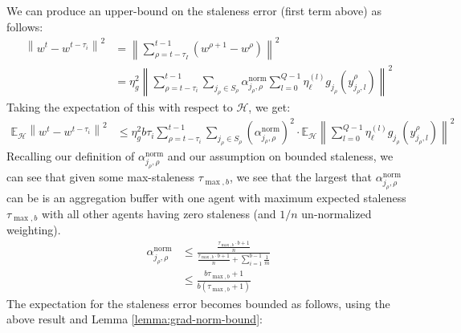 \documentclass{article}
\begin{document}
We can produce an upper-bound on the staleness error (first term above) as follows:
\begin{align*}
    \left\|
        w^t - w^{t - \tau_i}
    \right\|^2
    &= 
    \left\|
        \sum_{\rho = t - \tau_I}^{t-1}
        {
            (w^{\rho + 1} - w^\rho)
        }
    \right\|^2
    \\
    &=
    \eta_g^2 \left\|
        \sum_{\rho = t - \tau_i}^{t-1}
        {
           \sum_{j_\rho \in S_\rho}
           {
                \alpha_{j_\rho, \rho}^\text{norm}
                \sum_{l=0}^{Q-1}
                {
                \eta_\ell^{(l)}
                g_{j_\rho}(y^\rho_{j_\rho, l})
                }
           }
        }
    \right\|^2
\end{align*}
Taking the expectation of this with respect to $\mathcal{H}$, we get:
\begin{align*}
    \mathbb{E}_\mathcal{H}\left\|
        w^t - w^{t - \tau_i}
    \right\|^2
    &\leq 
    \eta_g^2 b \tau_i 
        \sum_{\rho = t - \tau_i}^{t-1}
        {
           \sum_{j_\rho \in S_\rho}
           {
                (\alpha_{j_\rho, \rho}^\text{norm})^2
                \cdot
                \mathbb{E}_\mathcal{H}
                \left\|\sum_{l=0}^{Q-1}
                {
                \eta_\ell^{(l)}
                g_{j_\rho}(y^\rho_{j_\rho, l})
                }
                 \right\|^2
           }
        }
\end{align*}
Recalling our definition of $\alpha^{\text{norm}}_{j_\rho, \rho}$ and our assumption on bounded staleness, we can see that given some max-staleness $\tau_{\max, b}$, we see that the largest that $\alpha^{\text{norm}}_{j_\rho, \rho}$ can be is an aggregation buffer with one agent with maximum expected staleness $\tau_{\max, b}$ with all other agents having zero staleness (and $1/n$ un-normalized weighting).
\begin{align*}
    \alpha^{\text{norm}}_{j_\rho, \rho} 
    &\leq \frac{
        \frac{\tau_{\max, b} \cdot b + 1}{n}
    }{
        \frac{\tau_{\max, b} \cdot b + 1}{n} + \sum_{i=1}^{b-1}{\frac{1}{m}}
    }
    \\
    &\leq \frac{b\tau_{\max, b} + 1}{b(\tau_{\max, b} + 1)}
\end{align*}
The expectation for the staleness error becomes bounded as follows, using the above result and Lemma \ref{lemma:grad-norm-bound}:
\end{document}
